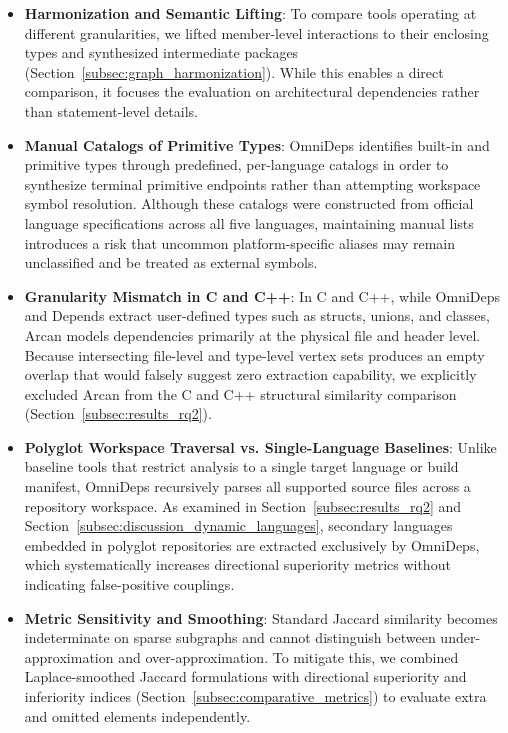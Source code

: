 \begin{itemize}[leftmargin=2.5em]
  \item \textbf{Harmonization and Semantic Lifting}:
    To compare tools operating at different granularities, we lifted
    member-level interactions to their enclosing types and synthesized
    intermediate packages (Section~\ref{subsec:graph_harmonization}). While
    this enables a direct comparison, it focuses the evaluation on
    architectural dependencies rather than statement-level details.

  \item \textbf{Manual Catalogs of Primitive Types}:
    OmniDeps identifies built-in and primitive types through predefined,
    per-language catalogs in order to synthesize terminal primitive endpoints
    rather than attempting workspace symbol resolution. Although these catalogs
    were constructed from official language specifications across all five
    languages, maintaining manual lists introduces a risk that uncommon
    platform-specific aliases may remain unclassified and be treated as
    external symbols.

  \item \textbf{Granularity Mismatch in C and C++}:
    In C and C++, while OmniDeps and Depends extract user-defined
    types such as structs, unions, and classes, Arcan models dependencies
    primarily at the physical file and header level. Because intersecting
    file-level and type-level vertex sets produces an empty overlap that would
    falsely suggest zero extraction capability, we explicitly excluded Arcan
    from the C and C++ structural similarity comparison
    (Section~\ref{subsec:results_rq2}).

  \item \textbf{Polyglot Workspace Traversal vs. Single-Language Baselines}:
    Unlike baseline tools that restrict analysis to a single target language or
    build manifest, OmniDeps recursively parses all supported source files
    across a repository workspace. As examined in
    Section~\ref{subsec:results_rq2} and
    Section~\ref{subsec:discussion_dynamic_languages}, secondary languages
    embedded in polyglot repositories are extracted exclusively by OmniDeps,
    which systematically increases directional superiority metrics without
    indicating false-positive couplings.

  \item \textbf{Metric Sensitivity and Smoothing}:
    Standard Jaccard similarity becomes indeterminate on sparse subgraphs and
    cannot distinguish between under-approximation and over-approximation. To
    mitigate this, we combined Laplace-smoothed Jaccard formulations with
    directional superiority and inferiority indices
    (Section~\ref{subsec:comparative_metrics}) to evaluate extra and omitted
    elements independently.
\end{itemize}

